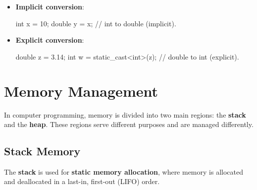 \begin{itemize}
    \item \textbf{Implicit conversion}:
    \vspace{-0.5em}
    \begin{codeblock}[language=C++, numbers=none]
    int x = 10;
    double y = x; // int to double (implicit).
    \end{codeblock}
    \item \textbf{Explicit conversion}:
    \vspace{-0.5em}
    \begin{codeblock}[language=C++, numbers=none]
    double z = 3.14;
    int w = static_cast<int>(z); // double to int (explicit).
    \end{codeblock}
\end{itemize}

\vspace{-0.8em}

\section{Memory Management}

In computer programming, memory is divided into two main regions: the \textbf{stack} and the \textbf{heap}. These regions serve different purposes and are managed differently.

\vspace{-0.5em}

\subsection{Stack Memory}

The \textbf{stack} is used for \textbf{static memory allocation}, where memory is allocated and deallocated in a last-in, first-out (LIFO) order.

\vspace{-0.5em} 

